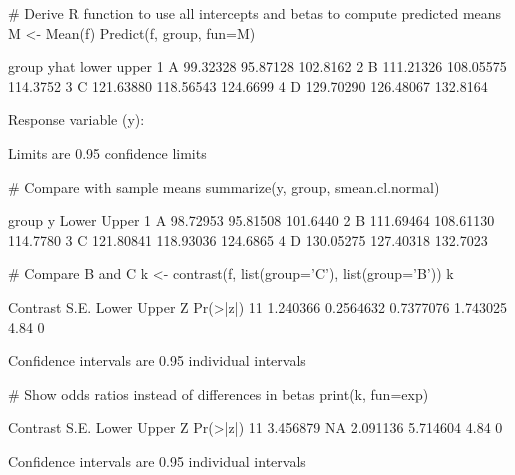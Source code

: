 \begin{Schunk}
\begin{Sinput}
# Derive R function to use all intercepts and betas to compute predicted means
M <- Mean(f)
Predict(f, group, fun=M)
\end{Sinput}
\begin{Soutput}
  group      yhat     lower    upper
1     A  99.32328  95.87128 102.8162
2     B 111.21326 108.05575 114.3752
3     C 121.63880 118.56543 124.6699
4     D 129.70290 126.48067 132.8164

Response variable (y):  

Limits are 0.95 confidence limits
\end{Soutput}
\begin{Sinput}
# Compare with sample means
summarize(y, group, smean.cl.normal)
\end{Sinput}
\begin{Soutput}
  group         y     Lower    Upper
1     A  98.72953  95.81508 101.6440
2     B 111.69464 108.61130 114.7780
3     C 121.80841 118.93036 124.6865
4     D 130.05275 127.40318 132.7023
\end{Soutput}
\begin{Sinput}
# Compare B and C
k <- contrast(f, list(group='C'), list(group='B'))
k
\end{Sinput}
\begin{Soutput}
   Contrast      S.E.     Lower    Upper    Z Pr(>|z|)
11 1.240366 0.2564632 0.7377076 1.743025 4.84        0

Confidence intervals are 0.95 individual intervals
\end{Soutput}
\begin{Sinput}
# Show odds ratios instead of differences in betas
print(k, fun=exp)
\end{Sinput}
\begin{Soutput}
   Contrast S.E.    Lower    Upper    Z Pr(>|z|)
11 3.456879   NA 2.091136 5.714604 4.84        0

Confidence intervals are 0.95 individual intervals
\end{Soutput}
\end{Schunk}

